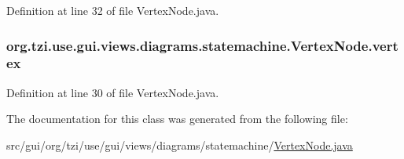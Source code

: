 Definition at line 32 of file Vertex\-Node.\-java.

\hypertarget{classorg_1_1tzi_1_1use_1_1gui_1_1views_1_1diagrams_1_1statemachine_1_1_vertex_node_a9475b226ad0fa74ddbbc6217874a867e}{
\subsubsection[{vertex}]{ org.\-tzi.\-use.\-gui.\-views.\-diagrams.\-statemachine.\-Vertex\-Node.\-vertex\hspace{0.3cm}{\ttfamily [protected]}}}\label{classorg_1_1tzi_1_1use_1_1gui_1_1views_1_1diagrams_1_1statemachine_1_1_vertex_node_a9475b226ad0fa74ddbbc6217874a867e}


Definition at line 30 of file Vertex\-Node.\-java.



The documentation for this class was generated from the following file\-:\begin{DoxyCompactItemize}
\item 
src/gui/org/tzi/use/gui/views/diagrams/statemachine/\hyperlink{_vertex_node_8java}{Vertex\-Node.\-java}\end{DoxyCompactItemize}

